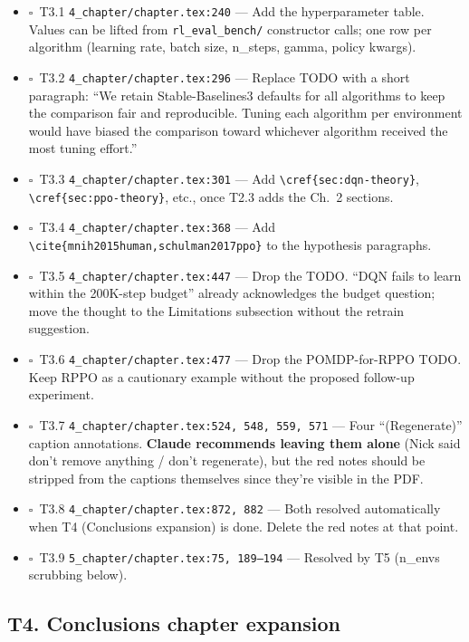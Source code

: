 \documentclass[11pt,a4paper]{article}
\newcommand{\todoitem}{$\square$~}
\newcommand{\fileline}[1]{\texttt{\small #1}}
\begin{document}
\begin{itemize}[leftmargin=*,itemsep=2pt]
  \item \todoitem T3.1 \fileline{4\_chapter/chapter.tex:240} ---
  Add the hyperparameter table. Values can be lifted from
  \fileline{rl\_eval\_bench/} constructor calls; one row per algorithm
  (learning rate, batch size, n\_steps, gamma, policy kwargs).
  \item \todoitem T3.2 \fileline{4\_chapter/chapter.tex:296} ---
  Replace TODO with a short paragraph: ``We retain Stable-Baselines3
  defaults for all algorithms to keep the comparison fair and
  reproducible. Tuning each algorithm per environment would have
  biased the comparison toward whichever algorithm received the most
  tuning effort.''
  \item \todoitem T3.3 \fileline{4\_chapter/chapter.tex:301} ---
  Add \fileline{\textbackslash cref\{sec:dqn-theory\}},
  \fileline{\textbackslash cref\{sec:ppo-theory\}}, etc., once T2.3
  adds the Ch.~2 sections.
  \item \todoitem T3.4 \fileline{4\_chapter/chapter.tex:368} ---
  Add \fileline{\textbackslash cite\{mnih2015human,schulman2017ppo\}} to
  the hypothesis paragraphs.
  \item \todoitem T3.5 \fileline{4\_chapter/chapter.tex:447} ---
  Drop the TODO. ``DQN fails to learn within the 200K-step budget''
  already acknowledges the budget question; move the thought to the
  Limitations subsection without the retrain suggestion.
  \item \todoitem T3.6 \fileline{4\_chapter/chapter.tex:477} ---
  Drop the POMDP-for-RPPO TODO. Keep RPPO as a cautionary example
  without the proposed follow-up experiment.
  \item \todoitem T3.7 \fileline{4\_chapter/chapter.tex:524, 548, 559, 571}
  --- Four ``(Regenerate)'' caption annotations. \textbf{Claude recommends
  leaving them alone} (Nick said don't remove anything / don't regenerate),
  but the red notes should be stripped from the captions themselves since
  they're visible in the PDF.
  \item \todoitem T3.8 \fileline{4\_chapter/chapter.tex:872, 882} ---
  Both resolved automatically when T4 (Conclusions expansion) is done.
  Delete the red notes at that point.
  \item \todoitem T3.9 \fileline{5\_chapter/chapter.tex:75, 189--194} ---
  Resolved by T5 (n\_envs scrubbing below).
\end{itemize}

\subsection*{T4. Conclusions chapter expansion}
\end{document}
